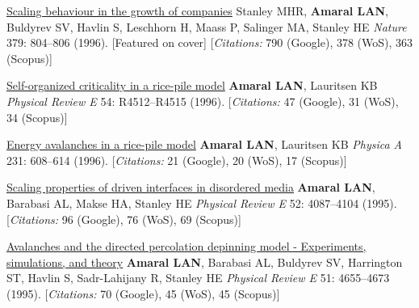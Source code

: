 \NumberedItem{\makebox[0.8cm][r]{[10]}}
\href{/people/amaral/scaling-behaviour-in-the-growth-of-companies}
{Scaling behaviour in the growth of companies}
\newline
Stanley MHR, {\textbf{Amaral LAN}}, Buldyrev SV, Havlin S, Leschhorn H, Maass P, Salinger MA, Stanley HE
\newline
\textit{Nature}
    379:
804--806 (1996).
    [Featured on cover]
    [{\em{Citations:}} 790 (Google), 378 (WoS), 363 (Scopus)]
\newline
\Gap
~
\Gap

\NumberedItem{\makebox[0.8cm][r]{[9]}}
\href{/people/amaral/self-organized-critically-in-a-rice-pile-model}
{Self-organized criticality in a rice-pile model}
\newline
{\textbf{Amaral LAN}}, Lauritsen KB
\newline
\textit{Physical Review E}
    54:
R4512--R4515 (1996).
    [{\em{Citations:}} 47 (Google), 31 (WoS), 34 (Scopus)]
\newline
\Gap
~
\Gap

\NumberedItem{\makebox[0.8cm][r]{[8]}}
\href{/people/amaral/energy-avalanches-in-a-rice-pile-model}
{Energy avalanches in a rice-pile model}
\newline
{\textbf{Amaral LAN}}, Lauritsen KB
\newline
\textit{Physica A}
    231:
608--614 (1996).
    [{\em{Citations:}} 21 (Google), 20 (WoS), 17 (Scopus)]
\newline
\Gap
~
\Gap

\NumberedItem{\makebox[0.8cm][r]{[7]}}
\href{/people/amaral/scaling-properties-of-driven-interfaces-in-disordered-media}
{Scaling properties of driven interfaces in disordered media}
\newline
{\textbf{Amaral LAN}}, Barabasi AL, Makse HA, Stanley HE
\newline
\textit{Physical Review E}
    52:
4087--4104 (1995).
    [{\em{Citations:}} 96 (Google), 76 (WoS), 69 (Scopus)]
\newline
\Gap
~
\Gap

\NumberedItem{\makebox[0.8cm][r]{[6]}}
\href{/people/amaral/avalanches-and-the-directed-percolation-depinning-model-experiments-simulations-and-theory}
{Avalanches and the directed percolation depinning model - Experiments, simulations, and theory}
\newline
{\textbf{Amaral LAN}}, Barabasi AL, Buldyrev SV, Harrington ST, Havlin S, Sadr-Lahijany R, Stanley HE
\newline
\textit{Physical Review E}
    51:
4655--4673 (1995).
    [{\em{Citations:}} 70 (Google), 45 (WoS), 45 (Scopus)]
\newline
\Gap
~
\Gap


